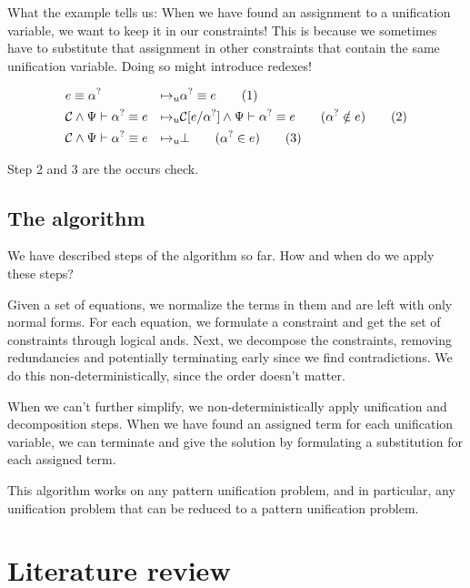 \documentclass[twoside,12pt,a4paper]{article}
\begin{document}
What the example tells us: When we have found an assignment to a unification variable, we want to keep it in our constraints!
This is because we sometimes have to substitute that assignment in other constraints that contain the same unification variable.
Doing so might introduce redexes!
\begin{definition}[Unification]
    \begin{align*}
        & e \equiv\alpha^?
        &\mapsto_u& \alpha^? \equiv e 
        \tag{1}\\
        &\mathcal{C} \wedge \Psi \vdash \alpha^? \equiv e 
        &\mapsto_u& \mathcal{C}[e/\alpha^?] \wedge \Psi \vdash \alpha^? \equiv e \qquad (\alpha^? \notin e)
        \tag{2}\\
        &\mathcal{C} \wedge \Psi \vdash \alpha^? \equiv e
        &\mapsto_u& \bot \qquad(\alpha^?\in e)
        \tag{3}
    \end{align*}
\end{definition}
Step 2 and 3 are the occurs check.

\subsection{The algorithm}
We have described steps of the algorithm so far. How and when do we apply these steps?

Given a set of equations, we normalize the terms in them and are left with only normal forms. 
For each equation, we formulate a constraint and get the set of constraints through logical ands.
Next, we decompose the constraints, removing redundancies and potentially terminating early since we find contradictions.
We do this non-deterministically, since the order doesn't matter. %

When we can't further simplify, we non-deterministically apply unification and decomposition steps.
When we have found an assigned term for each unification variable, we can terminate and give the solution
by formulating a substitution for each assigned term.

This algorithm works on any pattern unification problem, and in particular, any unification problem that can be reduced to a pattern unification problem. %

\section{Literature review}\label{sec:Literature review}
\end{document}
